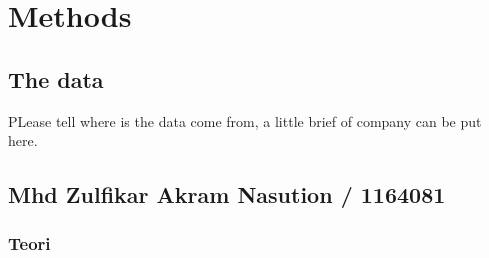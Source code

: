 \chapter{Methods}

\section{The data}
PLease tell where is the data come from, a little brief of company can be put here.

\section {Mhd Zulfikar Akram Nasution / 1164081}
\subsection {Teori}
